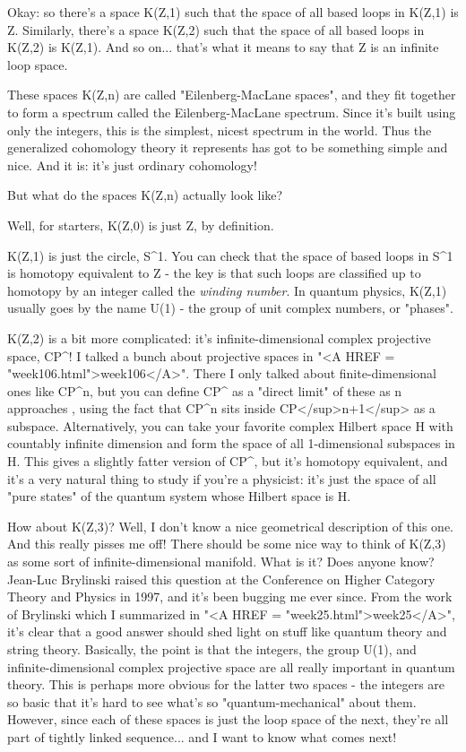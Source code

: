Okay: so there's a space K(Z,1) such that the space of all based loops
in K(Z,1) is Z.  Similarly, there's a space K(Z,2) such that the space 
of all based loops in K(Z,2) is K(Z,1).  And so on... that's what it
means to say that Z is an infinite loop space.

These spaces K(Z,n) are called "Eilenberg-MacLane spaces", and they fit
together to form a spectrum called the Eilenberg-MacLane spectrum. Since
it's built using only the integers, this is the simplest, nicest
spectrum in the world.  Thus the generalized cohomology theory it
represents has got to be something simple and nice.  And it is: it's
just ordinary cohomology!  

But what do the spaces K(Z,n) actually look like?  

Well, for starters, K(Z,0) is just Z, by definition.

K(Z,1) is just the circle, S^{1}.   
You can check that the space of based
loops in S^{1} is homotopy equivalent to Z - the key is that such loops
are classified up to homotopy by an integer called the \emph{winding number}.
In quantum physics, K(Z,1) usually goes by the name U(1) - the group
of unit complex numbers, or "phases".   

K(Z,2) is a bit more complicated: it's infinite-dimensional complex
projective space, CP^{\infty }!  I talked a bunch about projective 
spaces in "<A HREF = "week106.html">week106</A>".  There I only talked about finite-dimensional ones
like CP^{n}, but you can define CP^{\infty } 
as a "direct limit" of these 
as n approaches \infty , using the fact that CP^{n} sits inside 
CP</sup>n+1</sup> as
a subspace.   Alternatively, you can take your favorite complex Hilbert
space H with countably infinite dimension and form the space of all 
1-dimensional subspaces in H.  This gives a slightly fatter version of
CP^{\infty }, but it's homotopy equivalent, and it's a very natural 
thing to study if you're a physicist: it's just the space of all "pure 
states" of the quantum system whose Hilbert space is H.  

How about K(Z,3)?  Well, I don't know a nice geometrical description of
this one.  And this really pisses me off!  There should be some nice way
to think of K(Z,3) as some sort of infinite-dimensional manifold.  What
is it?  Does anyone know?  Jean-Luc Brylinski raised this question at the
Conference on Higher Category Theory and Physics in 1997, and it's been
bugging me ever since.  From the work of Brylinski which I summarized
in "<A HREF = "week25.html">week25</A>", it's clear that a good answer should shed light on stuff like
quantum theory and string theory.  Basically, the point is that the integers, 
the group U(1), and infinite-dimensional complex projective space are all 
really important in quantum theory.  This is perhaps more obvious for the
latter two spaces - the integers are so basic that it's hard to see what's
so "quantum-mechanical" about them.   However, since each of these spaces 
is just the loop space of the next, they're all part of tightly linked 
sequence... and I want to know what comes next!  


